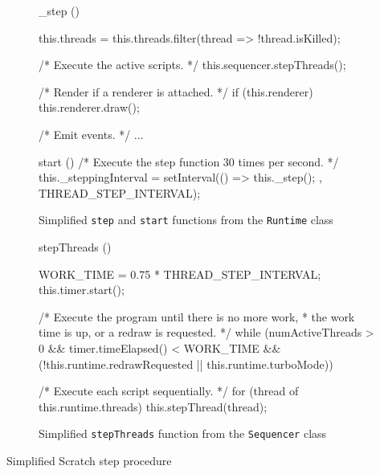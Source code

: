 \begin{listing}[htpb]
    \centering
    \begin{subfigure}{.9\textwidth}
        \begin{javascriptcode}
            _step () {
                this.threads = this.threads.filter(thread => !thread.isKilled);

                /* Execute the active scripts. */
                this.sequencer.stepThreads();

                /* Render if a renderer is attached. */
                if (this.renderer) {
                    this.renderer.draw();
                }

                /* Emit events. */
                ...
            }

            start () {
                /* Execute the step function 30 times per second. */
                this._steppingInterval = setInterval(() => {
                    this._step();
                }, THREAD_STEP_INTERVAL);
            }
        \end{javascriptcode}
        \vspace{-\bigskipamount}
        \caption{Simplified \texttt{step} and \texttt{start} functions from the \texttt{Runtime} class}
    \end{subfigure}

    \bigskip

    \begin{subfigure}{.9\textwidth}
        \begin{javascriptcode}
            stepThreads () {
                WORK_TIME = 0.75 * THREAD_STEP_INTERVAL;
                this.timer.start();

                /* Execute the program until there is no more work,
                 * the work time is up, or a redraw is requested. */
                while (numActiveThreads > 0 &&
                       timer.timeElapsed() < WORK_TIME &&
                       (!this.runtime.redrawRequested || this.runtime.turboMode)) {

                    /* Execute each script sequentially. */
                    for (thread of this.runtime.threads) {
                        this.stepThread(thread);
                    }
                }
            }
        \end{javascriptcode}
        \vspace{-\bigskipamount}
        \caption{Simplified \texttt{stepThreads} function from the \texttt{Sequencer} class}
    \end{subfigure}
    \caption{Simplified Scratch step procedure}
    \label{fig:simplified_scratch_step}
\end{listing}

